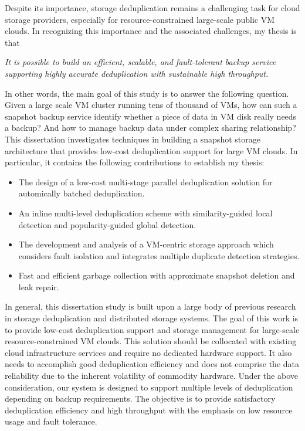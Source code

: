 Despite its importance, storage deduplication remains a challenging task for cloud storage providers,
especially for resource-constrained large-scale public VM clouds. 
In recognizing this importance and
the associated challenges,  my thesis is that

\textit{It  is  possible  to  build  an efficient, scalable, and fault-tolerant backup service
supporting highly accurate deduplication with sustainable high throughput.}

In  other  words,  the  main  goal  of this  study  is  to  answer  the  following 
question.  Given a large scale VM cluster running tens of thousand of VMs, 
how can such a snapshot backup service identify whether a piece of data in VM disk
really needs a backup? And how to manage backup data under complex sharing relationship?
This dissertation investigates 
techniques  in  building  a snapshot storage architecture that provides 
low-cost deduplication support for large VM clouds.  In particular,  it 
contains the following contributions to establish my thesis:

\begin{itemize}
\item The design of a low-cost multi-stage parallel deduplication solution for automically batched deduplication.
\item An inline multi-level deduplication scheme with similarity-guided local detection and 
popularity-guided global detection.
\item The development and analysis of a VM-centric storage approach which considers fault isolation and integrates multiple duplicate detection strategies.
\item Fast and efficient garbage collection with approximate snapshot deletion and leak repair.
\end{itemize}

In general, this  dissertation  study  is  built  upon  a  large  body  of previous  research 
in storage deduplication and distributed storage systems.  The goal 
of this work is to provide low-cost deduplication support and storage management for 
large-scale resource-constrained VM clouds. This solution should be collocated with existing
cloud infrastructure services and require no dedicated hardware support. It also needs to
accomplish good deduplication efficiency and does not comprise the data reliability due to the
inherent volatility of commodity hardware.
Under the  above consideration, our system is designed to support multiple levels of deduplication
depending on backup requirements. The objective is to provide satisfactory deduplication efficiency
and high throughput with the emphasis on low resource usage and fault tolerance.

